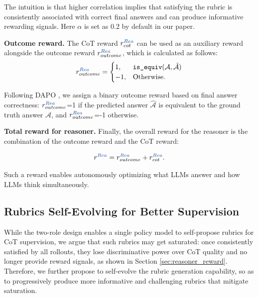 The intuition is that higher correlation implies that satisfying the rubric is consistently associated with correct final answers and can produce informative rewarding signals. Here $\alpha$ is set as 0.2 by default in our paper. 

\textbf{Outcome reward.} The CoT reward $r_{cot}^{\text{\textcolor{reasoner}{$Rea$}}}$ can be used as an auxiliary reward alongside the outcome reward $r^{\text{\textcolor{reasoner}{$Rea$}}}_{outcome}$, which is calculated as follows:
\begin{equation}\label{eq:outcome_reward}
r^{\text{\textcolor{reasoner}{$Rea$}}}_{outcome} =  
\begin{cases}
  1, & \texttt{is\_equiv}(\mathcal{A},\hat{\mathcal{A}})\\
  -1, & \text{Otherwise.}
\end{cases}
\end{equation}

Following DAPO \cite{DAPO}, we assign a binary outcome reward based on final answer correctness: $r^{\text{\textcolor{reasoner}{$Rea$}}}_{outcome}$=1 if the predicted answer $\hat{\mathcal{A}}$ is equivalent to the ground truth answer $\mathcal{A}$, and $r^{\text{\textcolor{reasoner}{$Rea$}}}_{outcome}$=-1 otherwise. 

\textbf{Total reward for reasoner.} Finally, the overall reward for the reasoner is the combination of the outcome reward and the CoT reward:

\begin{equation}
r^{\text{\textcolor{reasoner}{$Rea$}}} = 
    r^{\text{\textcolor{reasoner}{$Rea$}}}_{outcome} + r_{cot}^{\text{\textcolor{reasoner}{$Rea$}}}.
\end{equation}

Such a reward enables autonomously optimizing what LLMs answer and how LLMs think simultaneously. 

\subsection{Rubrics Self-Evolving for Better Supervision} \label{sec:reward_rubricator}
While the two-role design enables a single policy model to self-propose rubrics for CoT supervision, we argue that such rubrics may get saturated: once consistently satisfied by all rollouts, they lose discriminative power over CoT quality and no longer provide reward signals, as shown in Section \ref{sec:reasoner_reward}. 
Therefore, we further propose to self-evolve the rubric generation capability, so as to progressively produce more informative and challenging rubrics that mitigate saturation.

